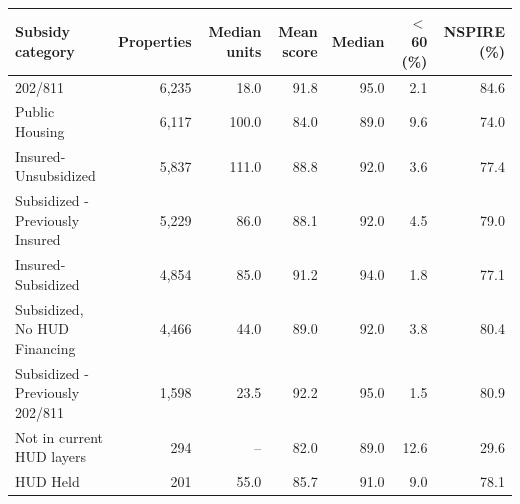 \begin{tabular}{lrrrrrr}
\toprule
Subsidy category & Properties & Median units & Mean score & Median & $<$60 (\%) & NSPIRE (\%) \\
\midrule
202/811 & 6,235 & 18.0 & 91.8 & 95.0 & 2.1 & 84.6 \\
Public Housing & 6,117 & 100.0 & 84.0 & 89.0 & 9.6 & 74.0 \\
Insured-Unsubsidized & 5,837 & 111.0 & 88.8 & 92.0 & 3.6 & 77.4 \\
Subsidized - Previously Insured & 5,229 & 86.0 & 88.1 & 92.0 & 4.5 & 79.0 \\
Insured-Subsidized & 4,854 & 85.0 & 91.2 & 94.0 & 1.8 & 77.1 \\
Subsidized, No HUD Financing & 4,466 & 44.0 & 89.0 & 92.0 & 3.8 & 80.4 \\
Subsidized - Previously 202/811 & 1,598 & 23.5 & 92.2 & 95.0 & 1.5 & 80.9 \\
Not in current HUD layers & 294 & -- & 82.0 & 89.0 & 12.6 & 29.6 \\
HUD Held & 201 & 55.0 & 85.7 & 91.0 & 9.0 & 78.1 \\
\bottomrule
\end{tabular}
